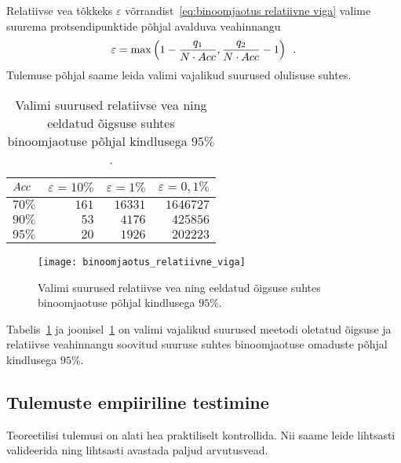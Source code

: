 Relatiivse vea tõkkeks $\varepsilon$ võrrandist~\eqref{eq:binoomjaotus relatiivne viga} valime suurema protsendipunktide põhjal avalduva veahinnangu
\begin{equation*}
    \varepsilon = \max \left( 1 - \frac{q_1}{N\cdot Acc} , \frac{q_2}{N\cdot Acc} - 1 \right) \enspace.
\end{equation*}
Tulemuse põhjal saame leida valimi vajalikud suurused olulisuse suhtes.

\begin{table}[H]
    \centering
    \caption{Valimi suurused relatiivse vea ning eeldatud õigsuse suhtes binoomjaotuse põhjal kindlusega $95\%$.}
    \begin{tabular}{l | r r r }
        $Acc$ & $\varepsilon=10\%$ & $\varepsilon=1\%$ & $\varepsilon=0{,}1\%$ \\
    	\hline
    	$70\%$ & $161$ & $16331$ & $1646727$ \\
    	$90\%$ & $53$  & $4176$  & $425856$  \\
    	$95\%$ & $20$   & $1926$  & $202223$  \\
    \end{tabular}
    \label{tab:binoomjaotus relatiivne viga}
\end{table}

\begin{figure}[H]
    \begin{center}
        \texttt{[image: binoomjaotus\_relatiivne\_viga]}
    \end{center}
    \caption{Valimi suurused relatiivse vea ning eeldatud õigsuse suhtes binoomjaotuse põhjal kindlusega $95\%$.}
    \label{fig:binoomjaotus relatiivne viga}
\end{figure}

Tabelis~\ref{tab:binoomjaotus relatiivne viga} ja joonisel~\ref{fig:binoomjaotus relatiivne viga} on valimi vajalikud suurused meetodi oletatud õigsuse ja relatiivse veahinnangu soovitud suuruse suhtes binoomjaotuse omaduste põhjal kindlusega $95\%$.

\subsection{Tulemuste empiiriline testimine}
Teoreetilisi tulemusi on alati hea praktiliselt kontrollida. Nii saame leide lihtsasti valideerida ning lihtsasti avastada paljud  arvutusvead.

